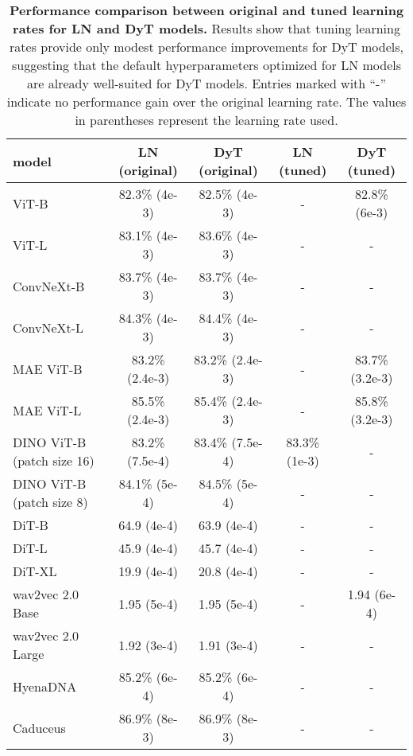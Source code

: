 \documentclass[]{fairmeta}
\newcommand{\tablestyle}[2]{\setlength{\tabcolsep}{#1}\renewcommand{\arraystretch}{#2}\centering\footnotesize}
\begin{document}
\begin{table}[h]
\centering
\tablestyle{7pt}{1.15}
\begin{tabular}{lcccc}
\toprule
model & LN (original) & DyT (original) & LN (tuned) & DyT (tuned)  \\
\midrule
ViT-B & 82.3\% \scriptsize{(4e-3)} & {82.5\%} \scriptsize{(4e-3)} & - & {82.8\%} \scriptsize{(6e-3)} \\
ViT-L & 83.1\% \scriptsize{(4e-3)} & {83.6\%} \scriptsize{(4e-3)} & - & - \\
ConvNeXt-B & 83.7\% \scriptsize{(4e-3)} & 83.7\% \scriptsize{(4e-3)} & - & - \\
ConvNeXt-L & 84.3\% \scriptsize{(4e-3)} & {84.4\%} \scriptsize{(4e-3)} & - & - \\
\midrule
MAE ViT-B & 83.2\% \scriptsize{(2.4e-3)} & 83.2\% \scriptsize{(2.4e-3)} & - & 83.7\% \scriptsize{(3.2e-3)} \\
MAE ViT-L & {85.5\%} \scriptsize{(2.4e-3)} & 85.4\% \scriptsize{(2.4e-3)} & - & {85.8\%} \scriptsize{(3.2e-3)} \\
DINO ViT-B (patch size 16) & 83.2\% \scriptsize{(7.5e-4)} & {83.4\%} \scriptsize{(7.5e-4)} & 83.3\% \scriptsize{(1e-3)} & - \\
DINO ViT-B (patch size 8) & 84.1\% \scriptsize{(5e-4)} & {84.5\%} \scriptsize{(5e-4)} & - & - \\
\midrule
DiT-B & 64.9 \scriptsize{(4e-4)} & {63.9} \scriptsize{(4e-4)} & - & - \\
DiT-L & {45.9} \scriptsize{(4e-4)} & 45.7 \scriptsize{(4e-4)} & - & - \\
DiT-XL & {19.9} \scriptsize{(4e-4)}  & 20.8 \scriptsize{(4e-4)} & - & - \\
\midrule
wav2vec 2.0 Base & 1.95 \scriptsize{(5e-4)} & 1.95 \scriptsize{(5e-4)} & - & {1.94} \scriptsize{(6e-4)} \\
wav2vec 2.0 Large & 1.92 \scriptsize{(3e-4)} & {1.91} \scriptsize{(3e-4)} & - & - \\
\midrule
HyenaDNA & 85.2\% \scriptsize{(6e-4)} & 85.2\% \scriptsize{(6e-4)} & - & - \\
Caduceus & 86.9\% \scriptsize{(8e-3)} & 86.9\% \scriptsize{(8e-3)} &  - & - \\
\midrule
  \end{tabular}
\caption{\textbf{Performance comparison between original and tuned learning rates for LN and DyT models.} Results show that tuning learning rates provide only modest performance improvements for DyT models, suggesting that the default hyperparameters optimized for LN models are already well-suited for DyT models. Entries marked with ``-'' indicate no performance gain over the original learning rate. The values in parentheses represent the learning rate used. 
}
\label{table:tuned_lr}
\end{table}
\end{document}
